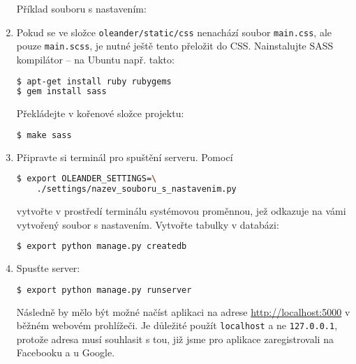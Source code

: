 \documentclass[12pt,oneside,final]{fithesis2}
\begin{document}
\begin{enumerate}
    Příklad souboru s nastavením:

        

    \item Pokud se ve složce {\tt oleander/static/css} nenachází soubor {\tt main.css}, ale pouze {\tt main.scss}, je nutné ještě tento přeložit do CSS. Nainstalujte SASS kompilátor -- na Ubuntu např. takto:

        \begin{lstlisting}[language=bash]
$ apt-get install ruby rubygems
$ gem install sass
        \end{lstlisting}

    Překládejte v kořenové složce projektu:

        \begin{lstlisting}[language=bash]
$ make sass
        \end{lstlisting}

    \item Připravte si terminál pro spuštění serveru. Pomocí

        \begin{lstlisting}[language=bash]
$ export OLEANDER_SETTINGS=\
    ./settings/nazev_souboru_s_nastavenim.py
        \end{lstlisting}

        vytvořte v prostředí terminálu systémovou proměnnou, jež odkazuje na vámi vytvořený soubor s nastavením. Vytvořte tabulky v databázi:

        \begin{lstlisting}[language=bash]
$ export python manage.py createdb
        \end{lstlisting}

    \item Spusťte server:

    \begin{lstlisting}[language=bash]
$ export python manage.py runserver
    \end{lstlisting}

    Následně by mělo být možné načíst aplikaci na adrese \url{http://localhost:5000} v běžném webovém prohlížeči. Je důležité použít {\tt localhost} a ne {\tt 127.0.0.1}, protože adresa musí souhlasit s tou, již jsme pro aplikace zaregistrovali na Facebooku a u Google.
\end{enumerate}
\end{document}
